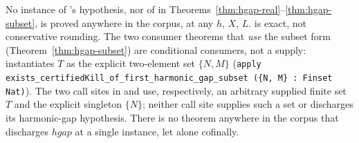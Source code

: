 \begin{obs}
\label{obs:no-instance}
No instance of 's hypothesis, nor of  in
Theorems~\ref{thm:hgap-real}--\ref{thm:hgap-subset}, is proved anywhere in the corpus, at any $h$,
$X$, $L$.  is exact, not conservative rounding. The two consumer theorems that
\emph{use} the subset form (Theorem~\ref{thm:hgap-subset}) are conditional consumers, not a
supply:  instantiates $T$ as
the explicit two-element set $\{N,M\}$ (\texttt{apply exists\_certifiedKill\_of\_first\_harmonic\_gap\_subset (\{N, M\} : Finset Nat)}). The two call sites in
 and
 use, respectively, an
arbitrary supplied finite set $T$ and the explicit singleton $\{N\}$; neither call site supplies
such a set or discharges its harmonic-gap hypothesis. There is no theorem anywhere in the corpus
that discharges $hgap$ at a single instance, let alone cofinally.
\end{obs}

